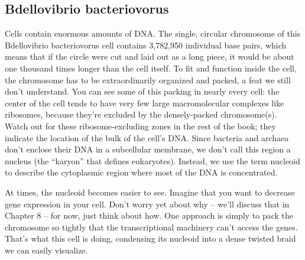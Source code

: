 \documentclass[]{tufte-book}
\begin{document}
\subsection{Bdellovibrio
bacteriovorus}\label{bdellovibrio-bacteriovorus}

Cells contain enormous amounts of DNA. The single, circular chromosome
of this Bdellovibrio bacteriovorus cell contains 3,782,950 individual
base pairs, which means that if the circle were cut and laid out as a
long piece, it would be about one thousand times longer than the cell
itself. To fit and function inside the cell, the chromosome has to be
extraordinarily organized and packed, a feat we still don't understand.
You can see some of this packing in nearly every cell: the center of the
cell tends to have very few large macromolecular complexes like
ribosomes, because they're excluded by the densely-packed chromosome(s).
Watch out for these ribosome-excluding zones in the rest of the book;
they indicate the location of the bulk of the cell's DNA. Since bacteria
and archaea don't enclose their DNA in a subcellular membrane, we don't
call this region a nucleus (the ``karyon'' that defines eukaryotes).
Instead, we use the term nucleoid to describe the cytoplasmic region
where most of the DNA is concentrated.

At times, the nucleoid becomes easier to see. Imagine that you want to
decrease gene expression in your cell. Don't worry yet about why --
we'll discuss that in Chapter 8 -- for now, just think about how. One
approach is simply to pack the chromosome so tightly that the
transcriptional machinery can't access the genes. That's what this cell
is doing, condensing its nucleoid into a dense twisted braid we can
easily visualize.


\end{document}
